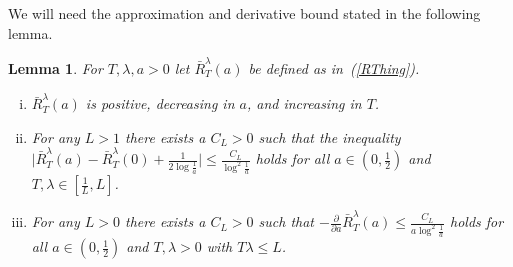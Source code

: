 \documentclass[10pt]{article}
\numberwithin{equation}{section}
\newtheorem{lemma}[theorem]{Lemma}
\theoremstyle{definition}
\begin{document}
We will need the approximation and derivative bound stated in the following lemma.
\begin{lemma} \label{LemmaRbarFunct} For  $T,\lambda,a>0$  let $\bar{R}_{T}^{\lambda}(a)$  be defined as in~(\ref{RThing}).
\begin{enumerate}[(i)]
\item $\bar{R}_{T}^{\lambda}(a)$ is positive, decreasing in $a$, and increasing  in $T$.


\item  For any $L>1$ there exists a $C_L>0$ such that the inequality $ \big| \bar{R}_{T}^{\lambda}(a)- \bar{R}_{T}^{\lambda}(0) +\frac{1}{2\log\frac{1}{a} }\big|\leq  \frac{C_L}{\log^2 \frac{1}{a} }  $  holds for all $a\in (0,\frac{1}{2})$ and  $T,\lambda \in [\frac{1}{L},  L]$.


\item  For any $L>0$ there exists a $C_L>0$ such that $-\frac{\partial}{\partial a} \bar{R}_{T}^{\lambda}(a) \leq  \frac{C_L}{a\log^2 \frac{1}{a} } $ holds for all $a\in (0,\frac{1}{2})$ and $T,\lambda>0$ with $T\lambda\leq L$.


\end{enumerate}

\end{lemma}
\end{document}
